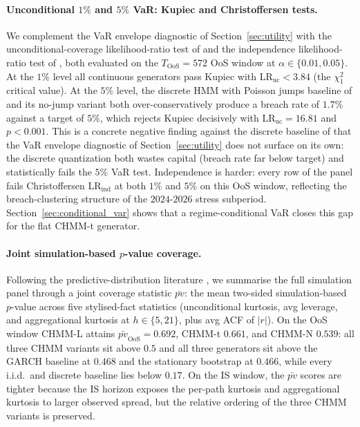 \paragraph{Unconditional $1\%$ and $5\%$ VaR: Kupiec and Christoffersen tests.}
We complement the VaR envelope diagnostic of Section~\ref{sec:utility} with the unconditional-coverage likelihood-ratio test of \citet{kupiec1995techniques} and the independence likelihood-ratio test of \citet{christoffersen1998evaluating}, both evaluated on the $T_{\text{OoS}} = 572$ OoS window at $\alpha \in \{0.01, 0.05\}$.
At the $1\%$ level all continuous generators pass Kupiec with $\text{LR}_{\text{uc}} < 3.84$ (the $\chi^2_1$ critical value).
At the $5\%$ level, the discrete HMM with Poisson jumps baseline of \citet{alswaidan2026hybrid} and its no-jump variant both over-conservatively produce a breach rate of $1.7\%$ against a target of $5\%$, which rejects Kupiec decisively with $\text{LR}_{\text{uc}} = 16.81$ and $p < 0.001$.
This is a concrete negative finding against the discrete baseline of \citet{alswaidan2026hybrid} that the VaR envelope diagnostic of Section~\ref{sec:utility} does not surface on its own: the discrete quantization both wastes capital (breach rate far below target) and statistically fails the $5\%$ VaR test.
Independence is harder: every row of the panel fails Christoffersen $\text{LR}_{\text{ind}}$ at both $1\%$ and $5\%$ on this OoS window, reflecting the breach-clustering structure of the $2024$-$2026$ stress subperiod.
Section~\ref{sec:conditional_var} shows that a regime-conditional VaR closes this gap for the flat CHMM-t generator.

\paragraph{Joint simulation-based $p$-value coverage.}
Following the predictive-distribution literature \citep{gneiting2007strictly}, we summarise the full simulation panel through a joint coverage statistic $\bar{pv}$: the mean two-sided simulation-based $p$-value across five stylised-fact statistics (unconditional kurtosis, avg leverage, and aggregational kurtosis at $h \in \{5, 21\}$, plus avg ACF of $|r|$).
On the OoS window CHMM-L attains $\bar{pv}_{\text{OoS}} = 0.692$, CHMM-t $0.661$, and CHMM-N $0.539$: all three CHMM variants sit above $0.5$ and all three generators sit above the GARCH baseline at $0.468$ and the stationary bootstrap at $0.466$, while every i.i.d.\ and discrete baseline lies below $0.17$.
On the IS window, the $\bar{pv}$ scores are tighter because the IS horizon exposes the per-path kurtosis and aggregational kurtosis to larger observed spread, but the relative ordering of the three CHMM variants is preserved.

